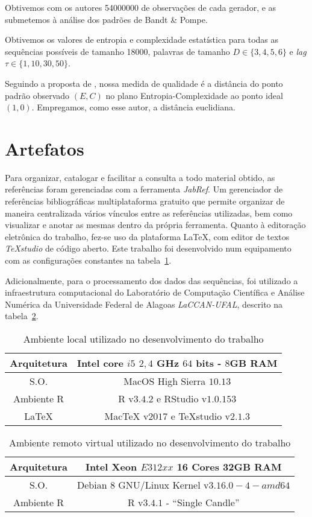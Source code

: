 Obtivemos com os autores \num{54000000} de observações de cada gerador, e as submetemos à análise dos padrões de Bandt \& Pompe.

Obtivemos os valores de entropia e complexidade estatística para todas as sequências possíveis de tamanho \num{18000}, palavras de tamanho $D\in\{3, 4, 5, 6\}$ e \textit{lag} $\tau\in\{1, 10, 30,50\}$.

Seguindo a proposta de \citet{NewPermutationEntropy}, nossa medida de qualidade é a distância do ponto padrão observado $(E,C)$ no plano Entropia-Complexidade ao ponto ideal $(1,0)$.
Empregamos, como esse autor, a distância euclidiana.


\section{Artefatos}Para organizar, catalogar e facilitar a consulta a todo material obtido, as referências foram gerenciadas com a ferramenta \emph{JabRef}. Um gerenciador de referências bibliográficas multiplataforma gratuito que permite organizar de maneira centralizada vários vínculos entre as referências utilizadas, bem como visualizar e anotar as mesmas dentro da própria ferramenta. Quanto à editoração eletrônica do trabalho, fez-se uso da plataforma \LaTeX, com editor de textos \emph{TeXstudio} de código aberto. Este trabalho foi desenvolvido num equipamento com as configurações constantes na tabela~\ref{local_env}.

Adicionalmente, para o processamento dos dados das sequências, foi utilizado a infraestrutura computacional do Laboratório de Computação Científica e Análise Numérica da Universidade Federal de Alagoas \textit{LaCCAN-UFAL}, descrito na tabela~\ref{virt_env}.

\begin{table}[hbt]
\centering
\caption{Ambiente local utilizado no desenvolvimento do trabalho}\label{local_env}
\begin{tabular}{c|c}
	\toprule
	Arquitetura & Intel core $i5$ $2,4$ GHz $64$ bits - $8$GB RAM\\
	\midrule
	S.O. & MacOS High Sierra $10.13$ \\
	\midrule
	Ambiente R & R v$3.4.2$ e RStudio v$1.0.153$\\
	\midrule
	\LaTeX & MacTeX v$2017$ e TeXstudio v$2.1.3$\\
	\bottomrule
\end{tabular}
\end{table}


\begin{table}[hbt]
\centering
\caption{Ambiente remoto virtual utilizado no desenvolvimento do trabalho}\label{virt_env}
\begin{tabular}{c|c}
	\toprule
	Arquitetura & Intel Xeon $E312xx$ 16 Cores 32GB RAM\\
	\midrule
	S.O. & Debian 8 GNU/Linux Kernel v$3.16.0-4-amd64$\\
	\midrule
	Ambiente R & R v$3.4.1$ - ``Single Candle''\\
	\bottomrule
\end{tabular}
\end{table}


